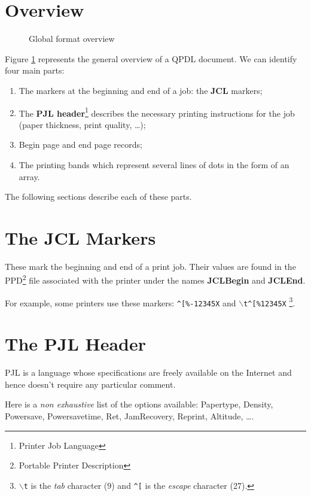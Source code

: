 \section{Overview}
\begin{figure}[!ht]

\caption{Global format overview}
\label{fig:schema_general}
\end{figure}

Figure \ref{fig:schema_general}
represents the general overview of a QPDL document.
We can identify four main parts:
\begin{enumerate}
	\item The markers at the beginning and end of a job: the \textbf{JCL} markers;
	\item The \textbf{PJL header}\footnote{Printer Job Language}
		describes the necessary printing instructions for the job
		(paper thickness, print quality, \ldots);
	\item Begin page and end page records;
	\item The printing bands which represent several lines of dots
		in the form of an array.
\end{enumerate}

The following sections describe each of these parts.


\section{The JCL Markers}
These mark the beginning and end of a print job.
Their values are found in the PPD\footnote{Portable Printer Description}
file associated with the printer under the names \textbf{JCLBegin} and \textbf{JCLEnd}.
\medskip

For example, some printers use these markers:
\texttt{\^{}[\%-12345X} and \texttt{$\backslash$t\^{}[\%12345X}
\footnote{\texttt{$\backslash$t} is the \emph{tab} character (9) and
\texttt{\^{}[} is the \emph{escape} character (27).}.


\section{The PJL Header}
PJL is a language whose specifications are freely available
on the Internet and hence doesn't require any particular comment.

Here is a \emph{non exhaustive} list of the options available:
Papertype, Density, Powersave, Powersavetime, Ret, JamRecovery, Reprint,
Altitude, \ldots.

